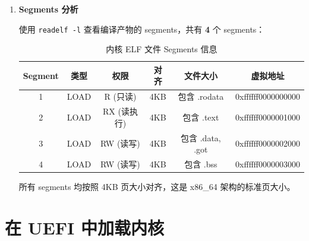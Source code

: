 \documentclass{SYSUReport}
\begin{document}
\begin{enumerate}[label={\chinese*、},labelsep=0pt]
\begin{enumerate}[label = \arabic*、]
        \item \textbf{Segments 分析}

        使用 \texttt{readelf -l} 查看编译产物的 segments，共有 \textbf{4} 个 segments：

        \begin{table}[h]
            \centering
            \caption{内核 ELF 文件 Segments 信息}
            \begin{tabular}{|c|c|c|c|c|c|}
                \hline
                \textbf{Segment} & \textbf{类型} & \textbf{权限} & \textbf{对齐} & \textbf{文件大小} & \textbf{虚拟地址} \\
                \hline
                1 & LOAD & R (只读) & 4KB & 包含 .rodata & 0xffffff0000000000 \\
                \hline
                2 & LOAD & RX (读执行) & 4KB & 包含 .text & 0xffffff0000001000 \\
                \hline
                3 & LOAD & RW (读写) & 4KB & 包含 .data, .got & 0xffffff0000002000 \\
                \hline
                4 & LOAD & RW (读写) & 4KB & 包含 .bss & 0xffffff0000003000 \\
                \hline
            \end{tabular}
        \end{table}

        所有 segments 均按照 4KB 页大小对齐，这是 x86\_64 架构的标准页大小。

    \end{enumerate}

\end{enumerate}

\section{在 UEFI 中加载内核}
\end{document}
